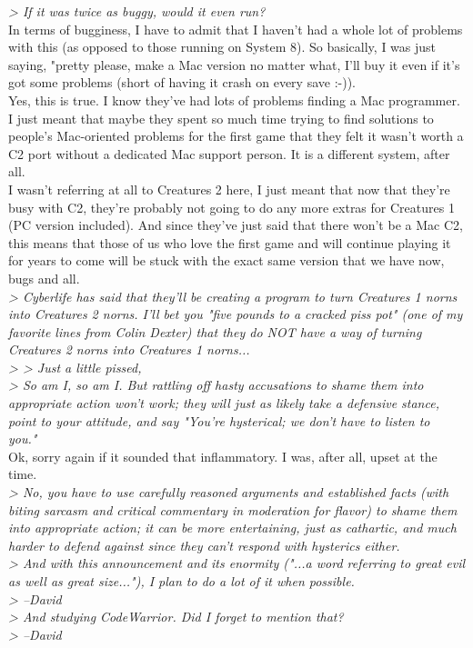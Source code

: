 \documentclass[11pt,twoside,a4paper]{article}
\begin{document}
\begin{multicols*}{2}
\emph{> If it was twice as buggy, would it even run?}~\\

In terms of bugginess, I have to admit that I haven't had a whole lot of problems with this (as opposed to those running on System 8). So basically, I was just saying, "pretty please, make a Mac version no matter what, I'll buy it even if it's got some problems (short of having it crash on every save :-)).~\\

Yes, this is true. I know they've had lots of problems finding a Mac programmer. I just meant that maybe they spent so much time trying to find solutions to people's Mac-oriented problems for the first game that they felt it wasn't worth a C2 port without a dedicated Mac support person. It is a different system, after all.~\\

I wasn't referring at all to Creatures 2 here, I just meant that now that they're busy with C2, they're probably not going to do any more extras for Creatures 1 (PC version included). And since they've just said that there won't be a Mac C2, this means that those of us who love the first game and will continue playing it for years to come will be stuck with the exact same version that we have now, bugs and all.~\\

\emph{> Cyberlife has said that they'll be creating a program to turn Creatures 1 norns into Creatures 2 norns. I'll bet you "five pounds to a cracked piss pot" (one of my favorite lines from Colin Dexter) that they do NOT have a way of turning Creatures 2 norns into Creatures 1 norns...}~\\

\emph{> > Just a little pissed,}~\\

\emph{> So am I, so am I. But rattling off hasty accusations to shame them into appropriate action won't work; they will just as likely take a defensive stance, point to your attitude, and say "You're hysterical; we don't have to listen to you."}~\\

Ok, sorry again if it sounded that inflammatory. I was, after all, upset at the time.~\\

\emph{> No, you have to use carefully reasoned arguments and established facts (with biting sarcasm and critical commentary in moderation for flavor) to shame them into appropriate action; it can be more entertaining, just as cathartic, and much harder to defend against since they can't respond with hysterics either.}~\\
\emph{> And with this announcement and its enormity ("...a word referring to great evil as well as great size..."), I plan to do a lot of it when possible.}~\\
\emph{> --David}~\\
\emph{> And studying CodeWarrior. Did I forget to mention that?}~\\
\emph{> --David}~\\


\end{multicols*}
\end{document}
